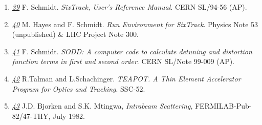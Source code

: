 \begin{enumerate}
	\item \href{SixTrack}{\textit{39}} F. Schmidt. \textit{SixTrack,
          User's Reference Manual}. CERN SL/94-56 (AP). 

	\item \href{SixTrack_Run_Environment}{\textit{40}} M. Hayes and
          F. Schmidt. \textit{Run Environment for SixTrack}. Physics
          Note 53 (unpublished) \& LHC Project Note 300. 

	\item \href{SODD}{\textit{41}} F. Schmidt. \textit{SODD: A
          computer code to calculate detuning and distortion function
          terms in first and second order}. CERN SL/Note 99-009 (AP). 

	\item \href{TEAPOT}{\textit{42}} R.Talman and
          L.Schachinger. \textit{TEAPOT. A Thin Element Accelerator
            Program for Optics and Tracking}. SSC-52. 

	\item \href{bm1}{\textit{43}} J.D. Bjorken and S.K. Mtingwa,
          \textit{Intrabeam Scattering},  FERMILAB-Pub-82/47-THY, July
          1982.  

\end{enumerate}



